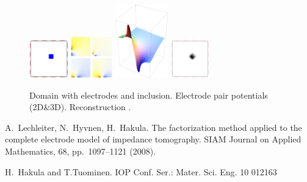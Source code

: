 \begin{figure}[h]
\centering
\includegraphics[width=0.15\textwidth]{./hakula/domain}\qquad
\includegraphics[width=0.16\textwidth]{./hakula/potentials}\qquad
\includegraphics[height=1.25in]{./hakula/potential3d}\qquad
\includegraphics[width=0.15\textwidth]{./hakula/reconstruction}\newline
\caption{Domain with electrodes and inclusion. Electrode pair potentials (2D\&3D). Reconstruction \cite{LHH}.}%
\label{fig}
\end{figure}


\begin{thebibliography}{10}
{\sc A.~Lechleiter, N.~Hyvnen, H.~Hakula}. {The factorization method applied to the complete electrode model of impedance tomography}. SIAM Journal on Applied Mathematics, 68, pp.~1097--1121 (2008).

 {\sc H.~Hakula and T.Tuominen}. IOP Conf. Ser.: Mater. Sci. Eng. 10 012163
\end{thebibliography}